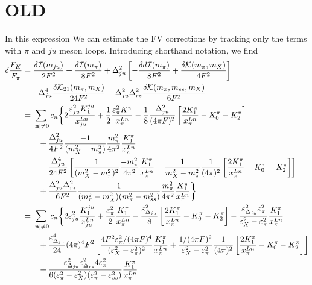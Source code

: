 \documentclass[prd,11pt,tightenlines,preprintnumbers,showpacs,superscriptaddress,notitlepage,nofootinbib,eqsecnum,floatfix,longbibliography]{revtex4-1}
\begin{document}
\section{OLD}
In this expression
We can estimate the FV corrections by tracking only the terms with $\pi$ and $ju$ meson loops.
Introducing shorthand notation, we find
\begin{align}
\d \frac{F_K}{F_\pi} &= 
	\frac{\d\mc{I(m_{ju})}}{2F^2}
	+\frac{\d\mc{I}(m_\pi)}{8F^2}
	+\D_{ju}^2 \left[ -\frac{\d d\mc{I}(m_\pi)}{8F^2} + \frac{\d\mc{K(}m_\pi,m_X)}{4F^2} \right]
\nonumber\\&\phantom{=}
	-\D_{ju}^4 \frac{\d\mc{K}_{21}(m_\pi,m_X)}{24 F^2}
	+\D_{ju}^2\D_{rs}^2 \frac{\d\mc{K}(m_\pi, m_{ss}, m_X)}{6F^2}
\nonumber\\&= \sum_{|\mathbf{n}|\neq0} c_n \bigg\{
	2\frac{\e_{ju}^2 K_1^{ju}}{x^{Ln}_{ju}}
	+\frac{1}{2}\frac{\e_{\pi}^2 K_1^\pi}{x^{Ln}_{\pi}}
	-\frac{1}{8}\frac{\D_{ju}^2}{(4\pi F)^2} \left[
		\frac{2K_1^\pi}{x^{Ln}_{\pi}}
		-K_0^\pi
		-K_2^\pi
	\right]
\nonumber\\&\qquad 
	+\frac{\D_{ju}^2}{4F^2} \frac{-1}{(m_X^2-m_\pi^2)} \frac{m_\pi^2}{4\pi^2} \frac{K_1^\pi}{x^{Ln}_{\pi}}
\nonumber\\&\qquad 
	-\frac{\D_{ju}^4}{24F^2} \left[
	\frac{1}{(m_X^2-m_\pi^2)^2}\frac{-m_\pi^2}{4\pi^2} \frac{K_1^\pi}{x^{Ln}_{\pi}}
	-\frac{1}{m_X^2 -m_\pi^2}\frac{1}{(4\pi)^2} \left[
		\frac{2K_1^\pi}{x^{Ln}_{\pi}}
		-K_0^\pi
		-K_2^\pi
	\right]
	\right]
\nonumber\\&\qquad 
	+\frac{\D_{ju}^2\D_{rs}^2}{6F^2} \frac{1}{(m_\pi^2-m_X^2)(m_\pi^2-m_{ss}^2)}
	\frac{m_\pi^2}{4\pi^2} \frac{K_1^\pi}{x^{Ln}_{\pi}}
	\bigg\}
\nonumber\\&= \sum_{|\mathbf{n}|\neq0} c_n \bigg\{
	2\e_{ju}^2\frac{K_1^{ju}}{x^{Ln}_{ju}}
	+\frac{\e_{\pi}^2}{2}\frac{K_1^\pi}{x^{Ln}_{\pi}}
	-\frac{\e_{\D_{ju}}^2}{8} \left[
		\frac{2K_1^\pi}{x^{Ln}_{\pi}}
		-K_0^\pi
		-K_2^\pi
	\right]
	-\frac{\e_{\D_{ju}}^2 \e_\pi^2}{\e_X^2-\e_\pi^2} \frac{K_1^\pi}{x^{Ln}_{\pi}}
\nonumber\\&\qquad 
	+\frac{\e_{\D_{ju}}^4}{24}(4\pi)^4F^2 \left[
	\frac{4F^2\e_\pi^2 / (4\pi F)^4}{(\e_X^2-\e_\pi^2)^2} \frac{K_1^\pi}{x^{Ln}_{\pi}}
	+\frac{1/(4\pi F)^2}{\e_X^2 -\e_\pi^2}\frac{1}{(4\pi)^2} \left[
		\frac{2K_1^\pi}{x^{Ln}_{\pi}}
		-K_0^\pi
		-K_2^\pi
	\right]
	\right]
\nonumber\\&\qquad 
	+\frac{\e_{\D_{ju}}^2\e_{\D_{rs}}^2 4\e_\pi^2}{6(\e_\pi^2-\e_X^2)(\e_\pi^2-\e_{ss}^2)}
	 \frac{K_1^\pi}{x^{Ln}_{\pi}}

\end{align}
\end{document}
